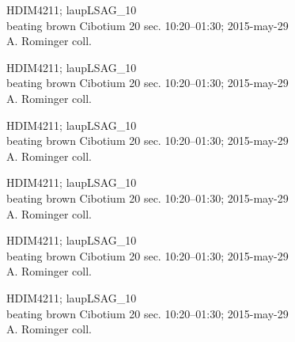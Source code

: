 \documentclass[2pt]{extarticle}
\begin{document}
\noindent
\parbox{0.16\textwidth}{\tiny \raggedright \rule[-0.3\baselineskip]{0pt}{10pt}HDIM4211; laupLSAG\_10\\ beating brown Cibotium 20 sec. 10:20--01:30; 2015-may-29\\ A. Rominger coll.}
\parbox{0.16\textwidth}{\tiny \raggedright \rule[-0.3\baselineskip]{0pt}{10pt}HDIM4211; laupLSAG\_10\\ beating brown Cibotium 20 sec. 10:20--01:30; 2015-may-29\\ A. Rominger coll.}
\parbox{0.16\textwidth}{\tiny \raggedright \rule[-0.3\baselineskip]{0pt}{10pt}HDIM4211; laupLSAG\_10\\ beating brown Cibotium 20 sec. 10:20--01:30; 2015-may-29\\ A. Rominger coll.}
\parbox{0.16\textwidth}{\tiny \raggedright \rule[-0.3\baselineskip]{0pt}{10pt}HDIM4211; laupLSAG\_10\\ beating brown Cibotium 20 sec. 10:20--01:30; 2015-may-29\\ A. Rominger coll.}
\parbox{0.16\textwidth}{\tiny \raggedright \rule[-0.3\baselineskip]{0pt}{10pt}HDIM4211; laupLSAG\_10\\ beating brown Cibotium 20 sec. 10:20--01:30; 2015-may-29\\ A. Rominger coll.}
\parbox{0.16\textwidth}{\tiny \raggedright \rule[-0.3\baselineskip]{0pt}{10pt}HDIM4211; laupLSAG\_10\\ beating brown Cibotium 20 sec. 10:20--01:30; 2015-may-29\\ A. Rominger coll.} \\ 
\vspace{0.001in} 
\end{document}
